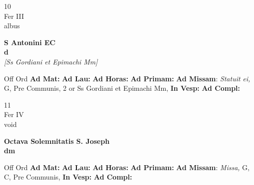 \documentclass[10pt, openany]{book}
\begin{document}
    \begin{center}
        \begin{minipage}{3.5in}
            \vspace{2em}
            \begin{minipage}{0.5in}
                {\Huge 10} \\
                {\normalsize Fer III} \\
                {\normalsize albus}
            \end{minipage}
            \begin{minipage}{3.0in}
                \textbf{ \large S Antonini EC \\
                \textnormal{\normalsize d}} \\ \textit{[Ss Gordiani et Epimachi Mm]} \\ 
            \end{minipage}
            \begin{justify}Off Ord
                \textbf{Ad Mat: }
                \textbf{Ad Lau: }
                \textbf{Ad Horas: }
                \textbf{Ad Primam: }\textbf{Ad Missam}: \textit{Statuit ei,} G, Pre Communis, 2 or Ss Gordiani et Epimachi Mm,  
                \textbf{In Vesp: }
                \textbf{Ad Compl: }
            \end{justify}
        \end{minipage}
    \end{center}

    \begin{center}
        \begin{minipage}{3.5in}
            \vspace{2em}
            \begin{minipage}{0.5in}
                {\Huge 11} \\
                {\normalsize Fer IV} \\
                {\normalsize void}
            \end{minipage}
            \begin{minipage}{3.0in}
                \textbf{ \large Octava Solemnitatis S. Joseph \\
                \textnormal{\normalsize dm}} \\ 
            \end{minipage}
            \begin{justify}Off Ord
                \textbf{Ad Mat: }
                \textbf{Ad Lau: }
                \textbf{Ad Horas: }
                \textbf{Ad Primam: }\textbf{Ad Missam}: \textit{Missa,} G, C, Pre Communis,  
                \textbf{In Vesp: }
                \textbf{Ad Compl: }
            \end{justify}
        \end{minipage}
    \end{center}
\end{document}
